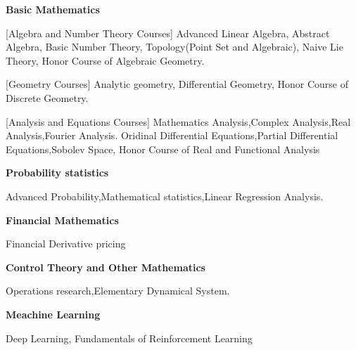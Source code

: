
\newcommand{\levelentry}[1]{\item \textbf{#1}}
\newenvironment{cvcourses}
{
    \begin{cvlist}\item
    \small
}
{
    \normalsize
    \end{cvlist}
}

\begin{cvlist}
    \levelentry{Basic Mathematics}
    \begin{cvcourses}[Algebra and Number Theory Courses]
        Advanced Linear Algebra,
        Abstract Algebra,
        Basic Number Theory,
        Topology(Point Set and Algebraic),
        Naive Lie Theory,
        Honor Course of Algebraic Geometry.
    \end{cvcourses}
    \begin{cvcourses}[Geometry Courses]
        Analytic geometry,
        Differential Geometry,
        Honor Course of Discrete Geometry.
    \end{cvcourses}
    \begin{cvcourses}[Analysis and Equations Courses]
        Mathematics Analysis,Complex Analysis,Real Analysis,Fourier Analysis.
        Oridinal Differential Equations,Partial Differential Equations,Sobolev Space,
        Honor Course of Real and Functional Analysis
    \end{cvcourses}
    \levelentry{Probability statistics}
    \begin{cvcourses}
        Advanced Probability,Mathematical statistics,Linear Regression Analysis.
    \end{cvcourses}
    \levelentry{Financial Mathematics}
    \begin{cvcourses}
        Financial Derivative pricing
    \end{cvcourses}
    \levelentry{Control Theory and Other Mathematics}
    \begin{cvcourses}
        Operations research,Elementary Dynamical System.
    \end{cvcourses}
    \levelentry{Meachine Learning}
    \begin{cvcourses}
        Deep Learning,
        Fundamentals of Reinforcement Learning
    \end{cvcourses}

\end{cvlist}

\endinput